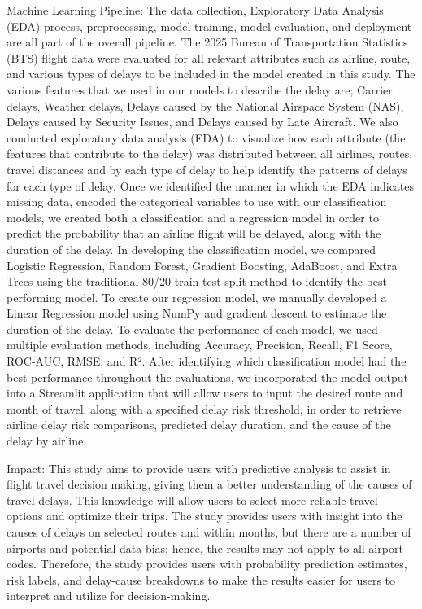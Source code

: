 Machine Learning Pipeline: The data collection, Exploratory Data Analysis (EDA) process, preprocessing, model training, model evaluation, and deployment are all part of the overall pipeline. The 2025 Bureau of Transportation Statistics (BTS) flight data were evaluated for all relevant attributes such as airline, route, and various types of delays to be included in the model created in this study. The various features that we used in our models to describe the delay are; Carrier delays, Weather delays, Delays caused by the National Airspace System (NAS), Delays caused by Security Issues, and Delays caused by Late Aircraft. We also conducted exploratory data analysis (EDA) to visualize how each attribute (the features that contribute to the delay) was distributed between all airlines, routes, travel distances and by each type of delay to help identify the patterns of delays for each type of delay. Once we identified the manner in which the EDA indicates missing data, encoded the categorical variables to use with our classification models, we created both a classification and a regression model in order to predict the probability that an airline flight will be delayed, along with the duration of the delay. In developing the classification model, we compared Logistic Regression, Random Forest, Gradient Boosting, AdaBoost, and Extra Trees using the traditional 80/20 train-test split method to identify the best-performing model. To create our regression model, we manually developed a Linear Regression model using NumPy and gradient descent to estimate the duration of the delay. To evaluate the performance of each model, we used multiple evaluation methods, including Accuracy, Precision, Recall, F1 Score, ROC-AUC, RMSE, and R². After identifying which classification model had the best performance throughout the evaluations, we incorporated the model output into a Streamlit application that will allow users to input the desired route and month of travel, along with a specified delay risk threshold, in order to retrieve airline delay risk comparisons, predicted delay duration, and the cause of the delay by airline.


Impact: This study aims to provide users with predictive analysis to assist in flight travel decision making, giving them a better understanding of the causes of travel delays. This knowledge will allow users to select more reliable travel options and optimize their trips. The study provides users with insight into the causes of delays on selected routes and within months, but there are a number of airports and potential data bias; hence, the results may not apply to all airport codes. Therefore, the study provides users with probability prediction estimates, risk labels, and delay-cause breakdowns to make the results easier for users to interpret and utilize for decision-making.

